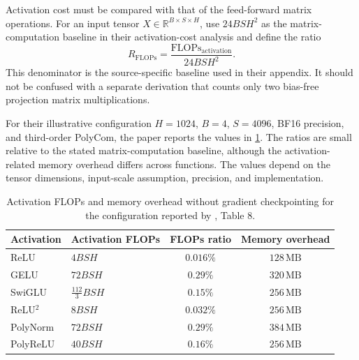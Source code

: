 Activation cost must be compared with that of the feed-forward
matrix operations. For an input tensor
\(X\in\mathbb{R}^{B\times S\times H}\), \textcite{zhuo2025polycom}
use \(24BSH^2\) as the matrix-computation baseline in their
activation-cost analysis and define the ratio
\begin{equation}
    R_{\mathrm{FLOPs}}
    =
    \frac{
        \mathrm{FLOPs}_{\mathrm{activation}}
    }{
        24BSH^2
    }.
    \label{eq:act-flops-ratio}
\end{equation}
This denominator is the source-specific baseline used in their
appendix. It should not be confused with a separate derivation
that counts only two bias-free projection matrix multiplications.

For their illustrative configuration
\(H=1024\), \(B=4\), \(S=4096\), BF16 precision, and third-order
PolyCom, the paper reports the values in
\cref{tab:act-computational-cost}. The ratios are small relative
to the stated matrix-computation baseline, although the
activation-related memory overhead differs across functions.
The values depend on the tensor dimensions, input-scale
assumption, precision, and implementation.

\begin{table}[htbp]
    \centering
    \caption{Activation FLOPs and memory overhead without gradient
    checkpointing for the configuration reported by
    \textcite{zhuo2025polycom}, Table 8.}
    \label{tab:act-computational-cost}
    \small
    \begin{tabularx}{\textwidth}{l X c c}
        \toprule
        Activation & Activation FLOPs & FLOPs ratio & Memory overhead \\
        \midrule
        ReLU     & \(4BSH\)       & \(0.016\%\) & \(128\,\mathrm{MB}\) \\
        GELU     & \(72BSH\)      & \(0.29\%\)  & \(320\,\mathrm{MB}\) \\
        SwiGLU   & \(\frac{112}{3}BSH\) & \(0.15\%\) & \(256\,\mathrm{MB}\) \\
        ReLU\(^{2}\) & \(8BSH\)   & \(0.032\%\) & \(256\,\mathrm{MB}\) \\
        PolyNorm & \(72BSH\)      & \(0.29\%\)  & \(384\,\mathrm{MB}\) \\
        PolyReLU & \(40BSH\)      & \(0.16\%\)  & \(256\,\mathrm{MB}\) \\
        \bottomrule
    \end{tabularx}
    \normalsize
\end{table}

